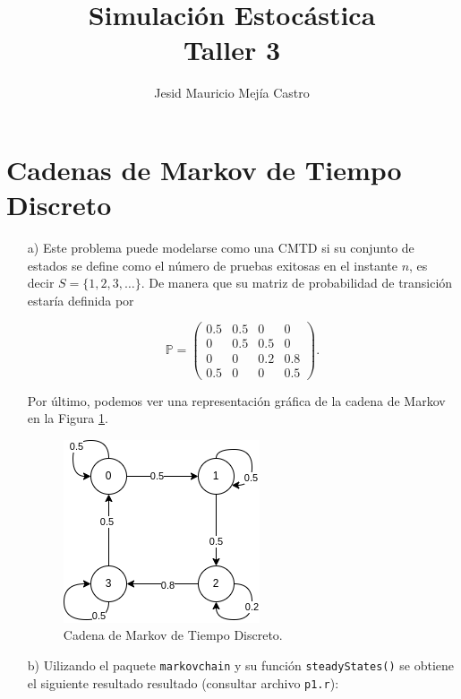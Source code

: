 \documentclass[11pt,letterpaper]{article}
\title{Simulación Estocástica\\Taller 3}
\author{Jesid Mauricio Mejía Castro}
\begin{document}
	\maketitle
	
	\section{Cadenas de Markov de Tiempo Discreto}	
	\begin{itemize}
		\item[a)] Este problema puede modelarse como una CMTD si su conjunto de estados se define como el número de pruebas exitosas en el instante $n$, es decir $S = \{1,2,3, \ldots\}$. De manera que su matriz de probabilidad de transición estaría definida por 
		
		\[
		\mathbb{P} = 
		\left( 
		\begin{matrix}
			0.5 & 0.5 & 0 & 0 \\
			0 & 0.5 & 0.5 & 0 \\
			0 & 0 & 0.2 & 0.8 \\
			0.5 & 0 & 0 & 0.5
		\end{matrix}
		\right) \text{.}
		\]
		
		Por último, podemos ver una representación gráfica de la cadena de Markov en la Figura \ref{fig:1}.
		
		\begin{figure}[h!]
			\centering
			\includegraphics[width=0.5\linewidth]{../img/cmtd.png}
			\caption{Cadena de Markov de Tiempo Discreto.}
			\label{fig:1}
		\end{figure}
	
		
		\item[b)] Uilizando el paquete \texttt{markovchain} y su función \texttt{steadyStates()} se obtiene el siguiente resultado resultado (consultar archivo \texttt{p1.r}):
		

\end{itemize}
\end{document}
